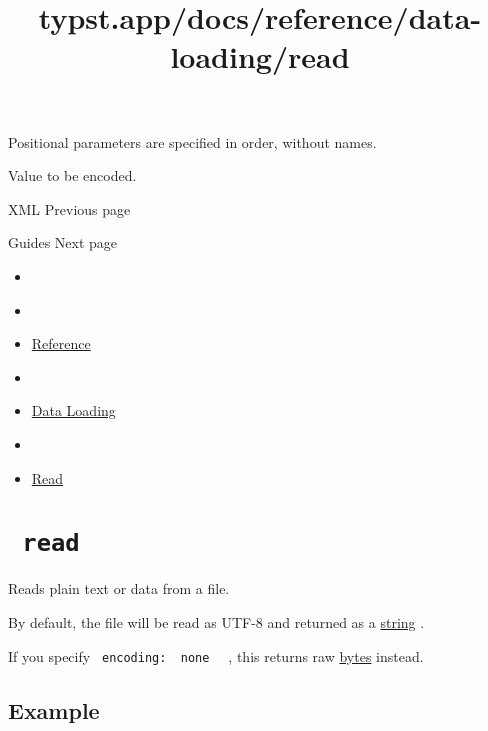 \label{definitions-encode-value-positional-tooltip}
Positional parameters are specified in order, without names.

Value to be encoded.

\href{/docs/reference/data-loading/xml/}{\pandocbounded{}}

{ XML } { Previous page }

\href{/docs/guides/}{\pandocbounded{}}

{ Guides } { Next page }


\title{typst.app/docs/reference/data-loading/read}

\begin{itemize}
\tightlist
\item
  \href{/docs}{}
\item
  
\item
  \href{/docs/reference/}{Reference}
\item
  
\item
  \href{/docs/reference/data-loading/}{Data Loading}
\item
  
\item
  \href{/docs/reference/data-loading/read/}{Read}
\end{itemize}

\section{\texorpdfstring{\texttt{\ read\ }}{ read }}\label{summary}

Reads plain text or data from a file.

By default, the file will be read as UTF-8 and returned as a
\href{/docs/reference/foundations/str/}{string} .

If you specify \texttt{\ encoding:\ }{\texttt{\ none\ }}\texttt{\ } ,
this returns raw \href{/docs/reference/foundations/bytes/}{bytes}
instead.

\subsection{Example}\label{example}

